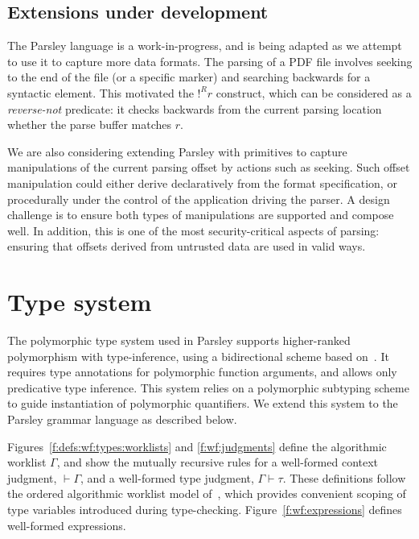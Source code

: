 \documentclass[letterpaper]{article}
\begin{document}
\subsection*{Extensions under development}

The Parsley language is a work-in-progress, and is being adapted as we
attempt to use it to capture more data formats.  The parsing of a PDF
file involves seeking to the end of the file (or a specific marker)
and searching backwards for a syntactic element.  This motivated the
$!^Rr$ construct, which can be considered as a \emph{reverse-not}
predicate: it checks backwards from the current parsing location
whether the parse buffer matches $r$.

We are also considering extending Parsley with primitives to capture
manipulations of the current parsing offset by actions such as
seeking.  Such offset manipulation could either derive declaratively
from the format specification, or procedurally under the control of
the application driving the parser.  A design challenge is to ensure
both types of manipulations are supported and compose well.  In
addition, this is one of the most security-critical aspects of
parsing: ensuring that offsets derived from untrusted data are used in
valid ways.

\section{Type system}
\label{s:typesys}

The polymorphic type system used in Parsley supports higher-ranked
polymorphism with type-inference, using a bidirectional scheme based
on~\cite{Dunfield13:bidir}.  It requires type annotations for
polymorphic function arguments, and allows only predicative type
inference.  This system relies on a polymorphic subtyping scheme
\cite{odersky96} to guide instantiation of polymorphic quantifiers.
We extend this system to the Parsley grammar language as described
below.

Figures~\ref{f:defs:wf:types:worklists} and \ref{f:wf:judgments}
define the algorithmic worklist $\Gamma$, and show the mutually
recursive rules for a well-formed context judgment, $\vdash\Gamma$,
and a well-formed type judgment, $\Gamma\vdash\tau$.  These
definitions follow the ordered algorithmic worklist model
of~\cite{zhao2018,zhao19:bidir}, which provides convenient scoping of
type variables introduced during type-checking.
Figure~\ref{f:wf:expressions} defines well-formed expressions.
\end{document}
